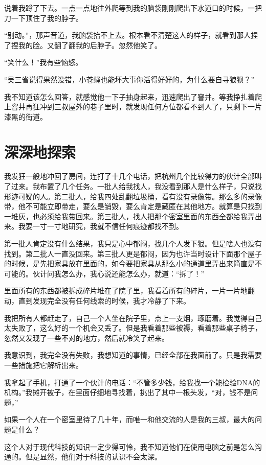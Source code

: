 说着我蹲了下去。一点一点地往外爬等到我的脑袋刚刚爬出下水道口的时候，一把刀一下顶住了我的脖子。

“别动。”，那声音道，我脑袋抬不上去。根本看不清楚这人的样子，就看到那人捏了捏我的脸。又翻了翻我的后脖子。忽然他笑了。

“笑什么！”我有些恼怒。

“吴三省说得果然没错，小苍蝇也能坏大事你活得好好的，为什么要自寻狼狈？”

我不知道该怎么回答，就感觉他一下子抽身起来，迅速爬出了窨井。等我挣扎着爬上窨井再狂冲到三叔屋外的巷子里时，就发现任何方位都看不到人了，只剩下一片漆黑的街道。

\chapter{深深地探索}

我发狂一般地冲回了房间，连打了十几个电话，把杭州几个比较得力的伙计全部叫了过来。我布置了几个任务。一批人给我找人，我没看到那人是什么样子，只说找形迹可疑的人。第二批人，给我四处乱翻垃圾桶，看有没有录像带。那么多的录像带，他不可能立即带走，要么是销毁，要么肯定是藏匿在其他地方。就算是只找到一堆灰，也必须给我带回来。第三批人，找人把那个密室里面的东西全都给我弄出来。我要一寸一寸地研究，我就不信任何痕迹都找不到。

第一批人肯定没有什么结果，我只是心中郁闷，找几个人发下狠。但是啥人也没有找到。第二批人一直没回来。第三批人更是郁闷，因为也许当时设计下面那个屋子的时候，是先把家具放在里面的，如今要把家具从那么小的通道里弄出来简直是不可能的。伙计问我怎么办，我心说还能怎么办，就道：“拆了！”

里面所有的东西都被拆成碎片堆在了院子里，我看着所有的碎片，一片一片地翻动，直到发现完全没有任何线索的时候，我才冷静了下来。

我把所有人都赶走了，自己一个人坐在院子里，点上一支烟，琢磨着。我觉得自己太失败了，这么好的一个机会又丢了。但是我看着那些被褥，看着那些桌子椅子，忽然又发现了一些不对的地方，然后就冷笑了起来。

我意识到，我完全没有失败，我想知道的事情，已经全部在我面前了。只是我需要一些措施把它解析出来。

我拿起了手机，打通了一个伙计的电话：“不管多少钱，给我找一个能检验DNA的机构。”我摊开被子，在里面仔细地寻找着，挑出了其中一根头发，“对，钱不是问题，”

如果一个人在一个密室里待了几十年，而唯一和他交流的人是我的三叔，最大的问题是什么？

这个人对于现代科技的知识一定少得可怜，我不知道他们在使用电脑之前是怎么沟通的。但是显然，他们对于科技的认识不会太深。

